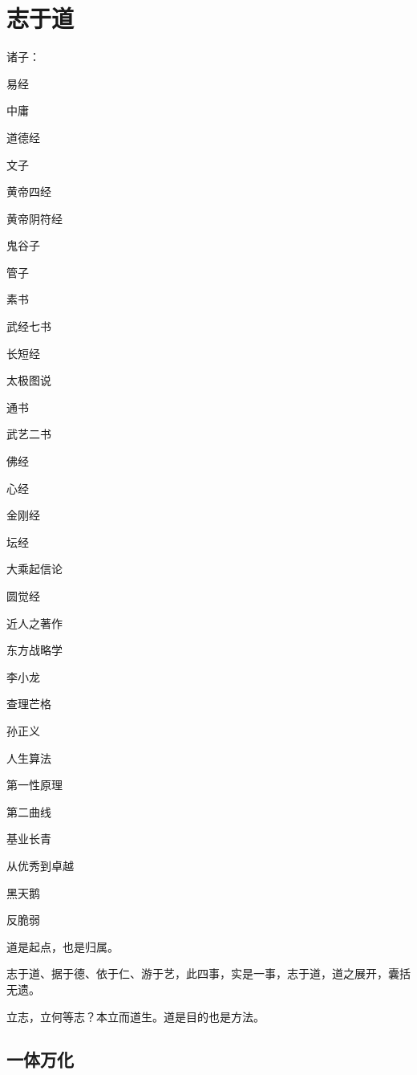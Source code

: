 \chapter{志于道}

诸子：
\begin{enumbox}
\item 易经
\item 中庸
\item 道德经
\item 文子
\item 黄帝四经
\item 黄帝阴符经
\item 鬼谷子
\item 管子
\item 素书
\item 武经七书
\item 长短经
\item 太极图说
\item 通书
\item 武艺二书
\end{enumbox}

佛经
\begin{enumbox}
\item 心经
\item 金刚经
\item 坛经
\item 大乘起信论
\item 圆觉经
\end{enumbox}

近人之著作
\begin{enumbox}
\item 东方战略学
\item 李小龙
\item 查理芒格
\item 孙正义
\item 人生算法
\item 第一性原理
\item 第二曲线
\item 基业长青
\item 从优秀到卓越
\item 黑天鹅
\item 反脆弱
\end{enumbox}

道是起点，也是归属。

志于道、据于德、依于仁、游于艺，此四事，实是一事，志于道，道之展开，囊括无遗。

立志，立何等志？本立而道生。道是目的也是方法。

\section{一体万化}

